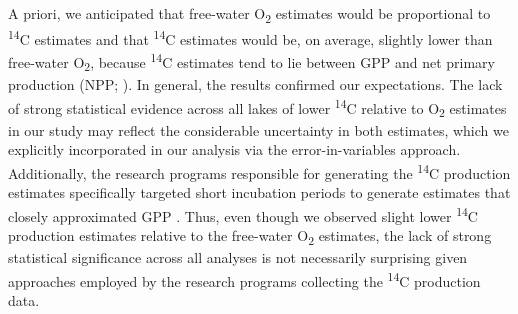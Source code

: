 \documentclass[12pt, oneside]{article}
\begin{document}
A priori, we anticipated that free-water O\textsubscript{2} estimates would be proportional to \textsuperscript{14}C estimates and that \textsuperscript{14}C estimates would be, on average, slightly lower than free-water O\textsubscript{2}, because \textsuperscript{14}C estimates tend to lie between GPP and net primary production (NPP; \citealt{peterson_aquatic_1980}). In general, the results confirmed our expectations. The lack of strong statistical evidence across all lakes of lower \textsuperscript{14}C relative to O\textsubscript{2} estimates in our study may reflect the considerable uncertainty in both estimates, which we explicitly incorporated in our analysis via the error-in-variables approach. Additionally, the research programs responsible for generating the \textsuperscript{14}C production estimates specifically targeted short incubation periods to generate estimates that closely approximated GPP \citep{hall_measuring_2007}. Thus, even though we observed slight lower \textsuperscript{14}C production estimates relative to the free-water O\textsubscript{2} estimates, the lack of strong statistical significance across all analyses is not necessarily surprising given approaches employed by the research programs collecting the \textsuperscript{14}C production data.
\end{document}
